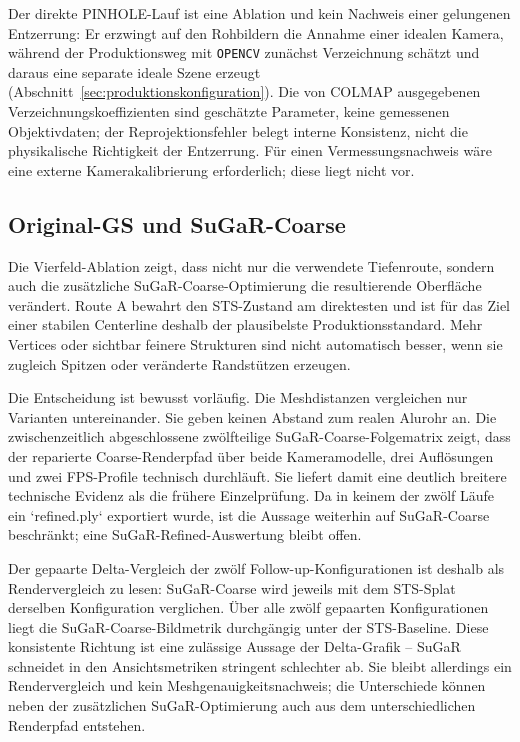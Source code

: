 Der direkte PINHOLE-Lauf ist eine Ablation und kein Nachweis einer gelungenen
Entzerrung: Er erzwingt auf den Rohbildern die Annahme einer idealen Kamera,
während der Produktionsweg mit \texttt{OPENCV} zunächst Verzeichnung schätzt
und daraus eine separate ideale Szene erzeugt
(Abschnitt~\ref{sec:produktionskonfiguration}). Die von COLMAP ausgegebenen
Verzeichnungskoeffizienten sind geschätzte Parameter, keine gemessenen
Objektivdaten; der Reprojektionsfehler belegt interne Konsistenz, nicht die
physikalische Richtigkeit der Entzerrung. Für einen Vermessungsnachweis wäre
eine externe Kamerakalibrierung erforderlich; diese liegt nicht vor.

\subsection{Original-GS und SuGaR-Coarse}

Die Vierfeld-Ablation zeigt, dass nicht nur die verwendete Tiefenroute, sondern
auch die zusätzliche SuGaR-Coarse-Optimierung die resultierende Oberfläche
verändert. Route A bewahrt den STS-Zustand am direktesten und ist für das Ziel
einer stabilen Centerline deshalb der plausibelste Produktionsstandard. Mehr
Vertices oder sichtbar feinere Strukturen sind nicht automatisch besser, wenn
sie zugleich Spitzen oder veränderte Randstützen erzeugen.

Die Entscheidung ist bewusst vorläufig. Die Meshdistanzen vergleichen nur
Varianten untereinander. Sie geben keinen Abstand zum realen Alurohr an. Die
zwischenzeitlich abgeschlossene zwölfteilige SuGaR-Coarse-Folgematrix zeigt,
dass der reparierte Coarse-Renderpfad über beide Kameramodelle, drei
Auflösungen und zwei FPS-Profile technisch durchläuft. Sie liefert damit eine
deutlich breitere technische Evidenz als die frühere Einzelprüfung. Da in keinem
der zwölf Läufe ein `refined.ply` exportiert wurde, ist die Aussage weiterhin
auf SuGaR-Coarse beschränkt; eine SuGaR-Refined-Auswertung bleibt offen.

Der gepaarte Delta-Vergleich der zwölf Follow-up-Konfigurationen ist deshalb
als Rendervergleich zu lesen: SuGaR-Coarse wird jeweils mit dem STS-Splat
derselben Konfiguration verglichen. Über alle zwölf gepaarten Konfigurationen
liegt die SuGaR-Coarse-Bildmetrik durchgängig unter der STS-Baseline. Diese
konsistente Richtung ist eine zulässige Aussage der Delta-Grafik – SuGaR
schneidet in den Ansichtsmetriken stringent schlechter ab. Sie bleibt
allerdings ein Rendervergleich und kein Meshgenauigkeitsnachweis; die
Unterschiede können neben der zusätzlichen SuGaR-Optimierung auch aus dem
unterschiedlichen Renderpfad entstehen.

